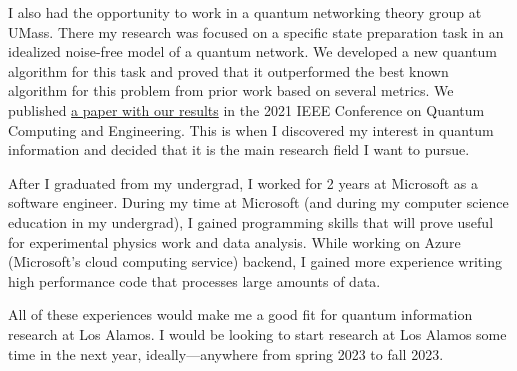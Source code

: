 \documentclass{article}
\begin{document}
	I also had the opportunity to work in a quantum networking theory group at UMass. There my research was focused on a specific state preparation task in an idealized noise-free model of a quantum network. We developed a new quantum algorithm for this task and proved that it outperformed the best known algorithm for this problem from prior work based on several metrics. We published \href{https://arxiv.org/abs/2009.10888}{a paper with our results} in the 2021 IEEE Conference on Quantum Computing and Engineering. This is when I discovered my interest in quantum information and decided that it is the main research field I want to pursue.
	
	After I graduated from my undergrad, I worked for 2 years at Microsoft as a software engineer. During my time at Microsoft (and during my computer science education in my undergrad), I gained programming skills that will prove useful for experimental physics work and data analysis. While working on Azure (Microsoft's cloud computing service) backend, I gained more experience writing high performance code that processes large amounts of data.
	
	All of these experiences would make me a good fit for quantum information research at Los Alamos. I would be looking to start research at Los Alamos some time in the next year, ideally---anywhere from spring 2023 to fall 2023.
\end{document}
